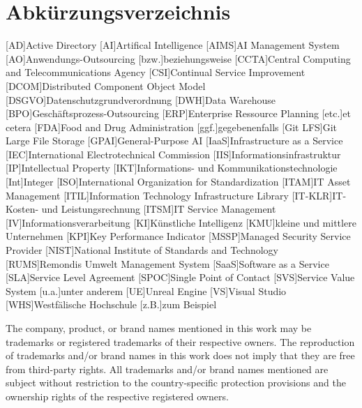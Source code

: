 %
\ClearShipoutPicture
\thispagestyle{empty}
\newpage
{}
\tableofcontents
\restoregeometry

\newpage
\section*{Abkürzungsverzeichnis} 
\begin{acronym}[Bash]
[AD]{Active Directory}
[AI]{Artifical Intelligence}
[AIMS]{AI Management System}
[AO]{Anwendungs-Outsourcing}
[bzw.]{beziehungsweise}
[CCTA]{Central Computing and Telecommunications Agency}
[CSI]{Continual Service Improvement}
[DCOM]{Distributed Component Object Model}
[DSGVO]{Datenschutzgrundverordnung}
[DWH]{Data Warehouse}
[BPO]{Geschäftsprozess-Outsourcing}
[ERP]{Enterprise Ressource Planning}
[etc.]{et cetera}
[FDA]{Food and Drug Administration}
[ggf.]{gegebenenfalls}
[Git LFS]{Git Large File Storage}
[GPAI]{General-Purpose AI}
[IaaS]{Infrastructure as a Service}
[IEC]{International Electrotechnical Commission}
[IIS]{Informationsinfrastruktur}
[IP]{Intellectual Property}
[IKT]{Informations- und Kommunikationstechnologie}
[Int]{Integer}
[ISO]{International Organization for Standardization}
[ITAM]{IT Asset Management}
[ITIL]{Information Technology Infrastructure Library}
[IT-KLR]{IT-Kosten- und Leistungsrechnung}
[ITSM]{IT Service Management}
[IV]{Informationsverarbeitung}
[KI]{Künstliche Intelligenz}
[KMU]{kleine und mittlere Unternehmen}
[KPI]{Key Performance Indicator}
[MSSP]{Managed Security Service Provider}
[NIST]{National Institute of Standards and Technology}
[RUMS]{Remondis Umwelt Management System}
[SaaS]{Software as a Service}
[SLA]{Service Level Agreement}
[SPOC]{Single Point of Contact}
[SVS]{Service Value System}
[u.a.]{unter anderem}
[UE]{Unreal Engine}
[VS]{Visual Studio}
[WHS]{Westfälische Hochschule}
[z.B.]{zum Beispiel}
\end{acronym}
\vfill
The company, product, or brand names mentioned in this work may be trademarks or registered trademarks of their respective owners.
The reproduction of trademarks and/or brand names in this work does not imply that they are free from third-party rights.
All trademarks and/or brand names mentioned are subject without restriction to the country-specific protection provisions and the ownership rights of the respective registered owners.
\newpage

